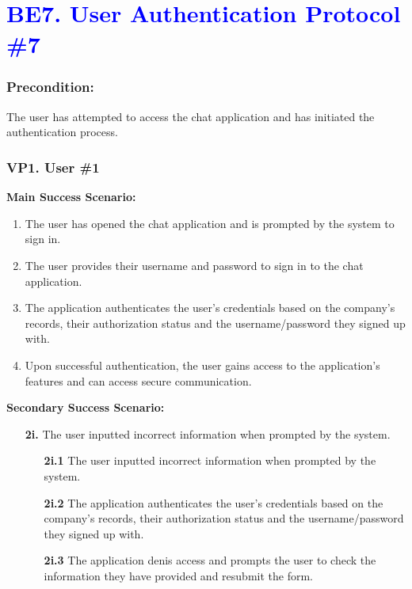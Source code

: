 \documentclass[]{article}
\begin{document}
\section*{\textcolor{blue}{BE7. User Authentication Protocol \#7}}
\subsubsection*{Precondition:} The user has attempted to access the chat application and has initiated the authentication process.
\subsubsection*{VP1. User \#1}
\textbf{Main Success Scenario:}
\begin{enumerate}
	\item The user has opened the chat application and is prompted by the system to sign in.
	\item The user provides their username and password to sign in to the chat application.
	\item The application authenticates the user's credentials based on the company's records, their authorization status and the username/password they signed up with.
	\item Upon successful authentication, the user gains access to the application's features and can access secure communication.
\end{enumerate}
\textbf{Secondary Success Scenario:}
\begin{enumerate}
	\item[\textbf{2i.}] The user inputted incorrect information when prompted by the system.
		\begin{enumerate}
			\item[\textbf{2i.1}] The user inputted incorrect information when prompted by the system.
			\item[\textbf{2i.2}] The application authenticates the user's credentials based on the company's records, their authorization status and the username/password they signed up with.
			\item[\textbf{2i.3}] The application denis access and prompts the user to check the information they have provided and resubmit the form.
		\end{enumerate}
\end{enumerate}
\end{document}
